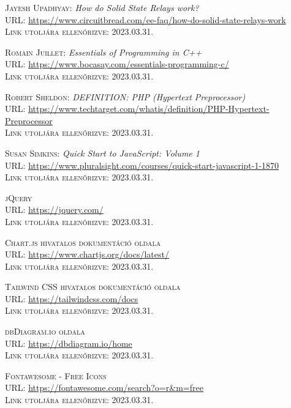 \documentclass[
]{thesis-ekf}
\theoremstyle{definition}
\theoremstyle{remark}
\begin{document}
\begin{thebibliography}{20}
		\textsc{Jayesh Upadhyay:} \emph{How do Solid State Relays work?}\\
		\textsc{URL:} \url{https://www.circuitbread.com/ee-faq/how-do-solid-state-relays-work}\\
		\textsc{Link utoljára ellenőrizve:} 2023.03.31.
		
		\textsc{Romain Juillet:} \emph{Essentials of Programming in C++}\\
		\textsc{URL:} \url{https://www.bocasay.com/essentials-programming-c/}\\
		\textsc{Link utoljára ellenőrizve:} 2023.03.31.
		
		\textsc{Robert Sheldon:} \emph{DEFINITION: PHP (Hypertext Preprocessor)}\\
		\textsc{URL:} \url{https://www.techtarget.com/whatis/definition/PHP-Hypertext-Preprocessor}\\
		\textsc{Link utoljára ellenőrizve:} 2023.03.31.
		
		\textsc{Susan Simkins:} \emph{Quick Start to JavaScript: Volume 1}\\
		\textsc{URL:} \url{https://www.pluralsight.com/courses/quick-start-javascript-1-1870}\\
		\textsc{Link utoljára ellenőrizve:} 2023.03.31.
		
		\textsc{jQuery}\\
		\textsc{URL:} \url{https://jquery.com/}\\
		\textsc{Link utoljára ellenőrizve:} 2023.03.31.
		
		\textsc{Chart.js hivatalos dokumentáció oldala}\\
		\textsc{URL:} \url{https://www.chartjs.org/docs/latest/}\\
		\textsc{Link utoljára ellenőrizve:} 2023.03.31.
		
		\textsc{Tailwind CSS hivatalos dokumentáció oldala}\\
		\textsc{URL:} \url{https://tailwindcss.com/docs}\\
		\textsc{Link utoljára ellenőrizve:} 2023.03.31.
		
		\textsc{dbDiagram.io oldala}\\
		\textsc{URL:} \url{https://dbdiagram.io/home}\\
		\textsc{Link utoljára ellenőrizve:} 2023.03.31.
		
		\textsc{Fontawesome - Free Icons}\\
		\textsc{URL:} \url{https://fontawesome.com/search?o=r&m=free}\\
		\textsc{Link utoljára ellenőrizve:} 2023.03.31.
		

\end{thebibliography}
\end{document}
